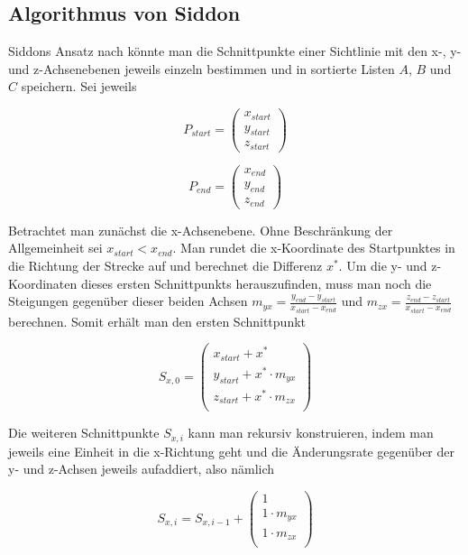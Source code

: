 \documentclass[]{dsadokumentation}
\begin{document}
\subsection{Algorithmus von Siddon}

Siddons Ansatz nach könnte man die Schnittpunkte einer Sichtlinie mit den x-, y- und z-Achsenebenen jeweils einzeln bestimmen und in sortierte Listen $A$, $B$ und $C$ speichern. Sei jeweils

\begin{equation}
  P_{start} = \begin{pmatrix}x_{start} \\ y_{start} \\ z_{start}\end{pmatrix}
\end{equation}

\begin{equation}
  P_{end} = \begin{pmatrix}x_{end} \\ y_{end} \\ z_{end}\end{pmatrix}
\end{equation}

Betrachtet man zunächst die x-Achsenebene. Ohne Beschränkung der Allgemeinheit sei $x_{start} < x_{end}$. Man rundet die x-Koordinate des Startpunktes in die Richtung der Strecke auf und berechnet die Differenz $x^{\ast}$. Um die y- und z-Koordinaten dieses ersten Schnittpunkts herauszufinden, muss man noch die Steigungen gegenüber dieser beiden Achsen $m_{yx} = \frac{y_{end} - y_{start}}{x_{start} - x_{end}}$ und $m_{zx} = \frac{z_{end} - z_{start}}{x_{start} - x_{end}}$ berechnen. Somit erhält man den ersten Schnittpunkt

\begin{equation}
  S_{x,0} = \begin{pmatrix}
    x_{start} + x^{\ast} \\
    y_{start} + x^{\ast} \cdot m_{yx} \\
    z_{start} + x^{\ast} \cdot m_{zx} \\
  \end{pmatrix}
\end{equation}

Die weiteren Schnittpunkte $S_{x,i}$ kann man rekursiv konstruieren, indem man jeweils eine Einheit in die x-Richtung geht und die Änderungsrate gegenüber der y- und z-Achsen jeweils aufaddiert, also nämlich

\begin{equation}
  S_{x,i} = S_{x,i-1} + \begin{pmatrix}
    1 \\
    1 \cdot m_{yx} \\
    1 \cdot m_{zx} \\
  \end{pmatrix}
\end{equation}
\end{document}
